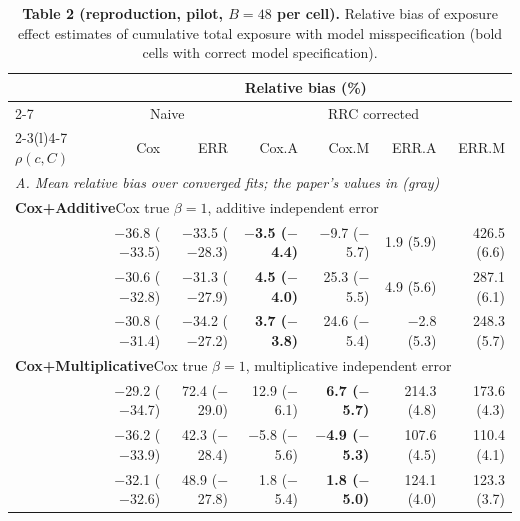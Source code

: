 \documentclass[10pt]{article}
\begin{document}
\begin{table}[ht]\centering\footnotesize
\begin{threeparttable}
\caption*{\textbf{Table 2 (reproduction, pilot, $B = 48$ per cell).} Relative bias of exposure effect estimates of cumulative total exposure with model misspecification (bold cells with correct model specification).}
\begin{tabular}{l rrrrrr}
\toprule
 & \multicolumn{6}{c}{Relative bias (\%)} \\
\cmidrule(l){2-7}
 & \multicolumn{2}{c}{Naive} & \multicolumn{4}{c}{RRC corrected} \\
\cmidrule(lr){2-3}\cmidrule(l){4-7}
$\rho(c, C)$ & Cox & ERR & Cox.A & Cox.M & ERR.A & ERR.M \\
\midrule
\multicolumn{7}{l}{\textit{A. Mean relative bias over converged fits; the paper's values in {\color{gray}(gray)}}} \\[2pt]
\multicolumn{7}{l}{\textbf{Cox+Additive}\quad Cox true $\beta = 1$, additive independent error} \\
\quad 0.3 & $-$36.8 {\color{gray}($-$33.5)} & $-$33.5 {\color{gray}($-$28.3)} & \boldmath\textbf{$-$3.5 {\color{gray}($-$4.4)}} & $-$9.7 {\color{gray}($-$5.7)} & 1.9 {\color{gray}(5.9)} & 426.5 {\color{gray}(6.6)} \\
\quad 0.6 & $-$30.6 {\color{gray}($-$32.8)} & $-$31.3 {\color{gray}($-$27.9)} & \boldmath\textbf{4.5 {\color{gray}($-$4.0)}} & 25.3 {\color{gray}($-$5.5)} & 4.9 {\color{gray}(5.6)} & 287.1 {\color{gray}(6.1)} \\
\quad 0.9 & $-$30.8 {\color{gray}($-$31.4)} & $-$34.2 {\color{gray}($-$27.2)} & \boldmath\textbf{3.7 {\color{gray}($-$3.8)}} & 24.6 {\color{gray}($-$5.4)} & $-$2.8 {\color{gray}(5.3)} & 248.3 {\color{gray}(5.7)} \\
\midrule
\multicolumn{7}{l}{\textbf{Cox+Multiplicative}\quad Cox true $\beta = 1$, multiplicative independent error} \\
\quad 0.3 & $-$29.2 {\color{gray}($-$34.7)} & 72.4 {\color{gray}($-$29.0)} & 12.9 {\color{gray}($-$6.1)} & \boldmath\textbf{6.7 {\color{gray}($-$5.7)}} & 214.3 {\color{gray}(4.8)} & 173.6 {\color{gray}(4.3)} \\
\quad 0.6 & $-$36.2 {\color{gray}($-$33.9)} & 42.3 {\color{gray}($-$28.4)} & $-$5.8 {\color{gray}($-$5.6)} & \boldmath\textbf{$-$4.9 {\color{gray}($-$5.3)}} & 107.6 {\color{gray}(4.5)} & 110.4 {\color{gray}(4.1)} \\
\quad 0.9 & $-$32.1 {\color{gray}($-$32.6)} & 48.9 {\color{gray}($-$27.8)} & 1.8 {\color{gray}($-$5.4)} & \boldmath\textbf{1.8 {\color{gray}($-$5.0)}} & 124.1 {\color{gray}(4.0)} & 123.3 {\color{gray}(3.7)} \\

\end{tabular}
\end{threeparttable}
\end{table}
\end{document}
